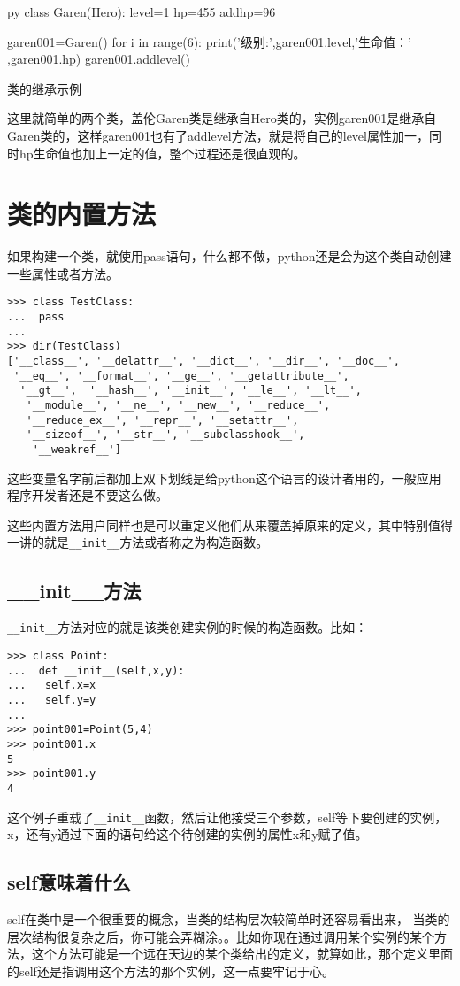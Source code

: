 \documentclass[12pt,oneside]{book}
\begin{document}
\begin{common-format}
\begin{xverbatim}[129]{py}
class Garen(Hero):
    level=1
    hp=455
    addhp=96

garen001=Garen()
for i in range(6):
    print('级别:',garen001.level,'生命值：' ,garen001.hp)
    garen001.addlevel()
\end{xverbatim}

\begin{fig}[0.5]{类的继承示例}
\caption{类的继承示例}
\label{fig:类的继承示例}
\end{fig}

这里就简单的两个类，盖伦Garen类是继承自Hero类的，实例garen001是继承自Garen类的，这样garen001也有了addlevel方法，就是将自己的level属性加一，同时hp生命值也加上一定的值，整个过程还是很直观的。


\section{类的内置方法}
如果构建一个类，就使用pass语句，什么都不做，python还是会为这个类自动创建一些属性或者方法。
\begin{Verbatim}
>>> class TestClass:
...  pass
... 
>>> dir(TestClass)
['__class__', '__delattr__', '__dict__', '__dir__', '__doc__',
 '__eq__', '__format__', '__ge__', '__getattribute__',
  '__gt__',  '__hash__', '__init__', '__le__', '__lt__',
   '__module__', '__ne__', '__new__', '__reduce__', 
   '__reduce_ex__', '__repr__', '__setattr__', 
   '__sizeof__', '__str__', '__subclasshook__',
    '__weakref__']
\end{Verbatim}

这些变量名字前后都加上双下划线是给python这个语言的设计者用的，一般应用程序开发者还是不要这么做。

这些内置方法用户同样也是可以重定义他们从来覆盖掉原来的定义，其中特别值得一讲的就是\verb+__init__+方法或者称之为构造函数。

\subsection{\_\_init\_\_{}方法}
\verb+__init__+方法对应的就是该类创建实例的时候的构造函数。比如：
\begin{Verbatim}
>>> class Point:
...  def __init__(self,x,y):
...   self.x=x
...   self.y=y
... 
>>> point001=Point(5,4)
>>> point001.x
5
>>> point001.y
4
\end{Verbatim}
这个例子重载了\verb+__init__+函数，然后让他接受三个参数，self等下要创建的实例，x，还有y通过下面的语句给这个待创建的实例的属性x和y赋了值。


\subsection{self意味着什么}
self在类中是一个很重要的概念，当类的结构层次较简单时还容易看出来， 当类的层次结构很复杂之后，你可能会弄糊涂。。比如你现在通过调用某个实例的某个方法，这个方法可能是一个远在天边的某个类给出的定义，就算如此，那个定义里面的self还是指调用这个方法的那个实例，这一点要牢记于心。


\end{common-format}
\end{document}
